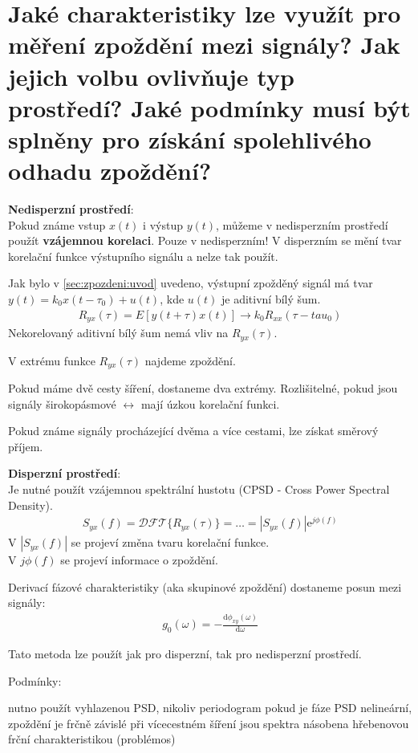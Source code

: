 \documentclass[a4paper,12pt]{article}   %
\newcommand{\mt}[1]{$#1$}
\newcommand{\e}{\text{e}}
\newcommand{\dd}{\text{d}}
\begin{document}
\section{Jaké charakteristiky lze využít pro měření zpoždění mezi signály? Jak jejich volbu ovlivňuje typ prostředí? Jaké podmínky musí být splněny pro získání spolehlivého odhadu zpoždění?}\label{sec:zpozdeni:zpusoby}

\textbf{Nedisperzní prostředí}:\\
Pokud známe vstup \mt{x(t)} i výstup \mt{y(t)}, můžeme v nedisperzním prostředí použít \textbf{vzájemnou korelaci}. Pouze v nedisperzním! V disperzním se mění tvar korelační funkce výstupního signálu a nelze tak použít. 

Jak bylo v \ref{sec:zpozdeni:uvod} uvedeno, výstupní zpožděný signál má tvar \mt{y(t) = k_0 x (t-\tau_0) + u(t)}, kde \mt{u(t)} je aditivní bílý šum.
\begin{align*}
        R_{yx}(\tau) = E[y(t+\tau)x(t)] \rightarrow k_0R_{xx}(\tau-tau_0)
\end{align*}
Nekorelovaný aditivní bílý šum nemá vliv na \mt{R_{yx}(\tau)}.

V extrému funkce \mt{R_{yx}(\tau)} najdeme zpoždění.

Pokud máme dvě cesty šíření, dostaneme dva extrémy. Rozlišitelné, pokud jsou signály širokopásmové \mt{\leftrightarrow} mají úzkou korelační funkci.

Pokud známe signály procházející dvěma a více cestami, lze získat směrový příjem.

\textbf{Disperzní prostředí}:\\
Je nutné použít vzájemnou spektrální hustotu (CPSD - Cross Power Spectral Density).
\begin{align*}
        S_{yx}(f) = \mathscr{DFT}\{R_{yx}(\tau)\} = \dots = |S_{yx}(f)|\e^{j\phi(f)}
\end{align*}
V \mt{|S_{yx}(f)|} se projeví změna tvaru korelační funkce.\\
V \mt{{j\phi(f)}} se projeví informace o zpoždění. 

Derivací fázové charakteristiky (aka skupinové zpoždění) dostaneme posun mezi signály:
\begin{align*}
        g_0(\omega) = -\frac{\dd \phi_{xy}(\omega)}{\dd \omega}
\end{align*}

Tato metoda lze použít jak pro disperzní, tak pro nedisperzní prostředí.

Podmínky:
\begin{outline}
        \1 nutno použít vyhlazenou PSD, nikoliv periodogram
        \1 pokud je fáze PSD nelineární, zpoždění je frčně závislé
        \1 při vícecestném šíření jsou spektra násobena hřebenovou frční charakteristikou (problémos)
\end{outline}
\end{document}
